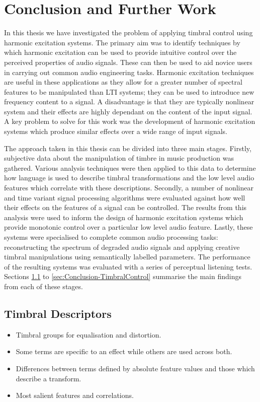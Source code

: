 \chapter{Conclusion and Further Work}
\label{chap:Conclusion}

	In this	thesis we have investigated the problem of applying timbral control using harmonic excitation systems. The
	primary aim was to identify techniques by which harmonic excitation can be used to provide intuitive control over
	the perceived properties of audio signals. These can then be used to aid novice users in carrying out common audio
	engineering tasks. Harmonic excitation techniques are useful in these applications as they allow for a greater
	number of spectral features to be manipulated than LTI systems; they can be used to introduce new frequency
	content to a signal. A disadvantage is that they are typically nonlinear system and their effects are highly
	dependant on the content of the input signal. A key problem to solve for this work was the development of harmonic
	excitation systems which produce similar effects over a wide range of input signals.

	The approach taken in this thesis can be divided into three main stages. Firstly, subjective data about the
	manipulation of timbre in music production was gathered. Various analysis techniques were then applied to this data
	to determine how language is used to describe timbral transformations and the low level audio features which
	correlate with these descriptions. Secondly, a number of nonlinear and time variant signal processing algorithms
	were evaluated against how well their effects on the features of a signal can be controlled. The results from this
	analysis were used to inform the design of harmonic excitation systems which provide monotonic control over a
	particular low level audio feature. Lastly, these systems were specialised to complete common audio processing
	tasks: reconstructing the spectrum of degraded audio signals and applying creative timbral manipulations using
	semantically labelled parameters. The performance of the resulting systems was evaluated with a series of perceptual
	listening tests. Sections \ref{sec:Conclusion-Descriptors} to \ref{sec:Conclusion-TimbralControl} summarise the main
	findings from each of these stages.

\section{Timbral Descriptors}
\label{sec:Conclusion-Descriptors}
	\note
	{
		\begin{itemize}
			\item Timbral groups for equalisation and distortion.
			\item Some terms are specific to an effect while others are used across both.
			\item Differences between terms defined by absolute feature values and those which describe a
				transform.
			\item Most salient features and correlations.
		\end{itemize}
	}

